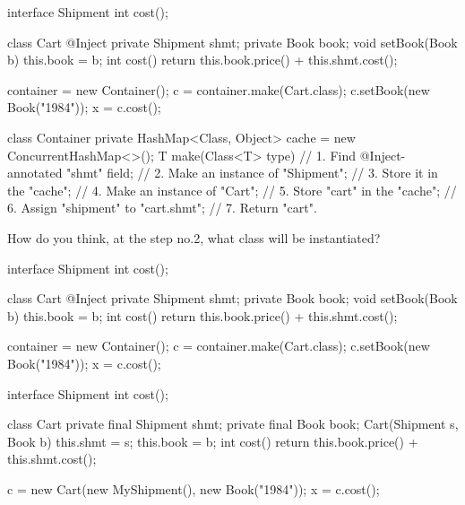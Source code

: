 \documentclass{article}
\begin{document}
\begin{pptWide}{2}
{\scriptsize\begin{ffcode}
interface Shipment
  int cost();

class Cart
  @Inject private Shipment shmt;
  private Book book;
  void setBook(Book b)
    this.book = b;
  int cost()
    return this.book.price() + this.shmt.cost();

container = new Container();
c = container.make(Cart.class);
c.setBook(new Book("1984"));
x = c.cost();
\end{ffcode}
}
\par\columnbreak\par
{\scriptsize\begin{ffcode}
class Container {
  private HashMap<Class, Object> cache =
    new ConcurrentHashMap<>();
  T make(Class<T> type) {
    // 1. Find @Inject-annotated "shmt" field;
    // 2. Make an instance of "Shipment";
    // 3. Store it in the "cache";
    // 4. Make an instance of "Cart";
    // 5. Store "cart" in the "cache";
    // 6. Assign "shipment" to "cart.shmt";
    // 7. Return "cart".
  }
}
\end{ffcode}
}
How do you think, at the step no.2,
what class will be instantiated?
\end{pptWide}
\par
\plush{}

\begin{pptWide}{2}
{\scriptsize\begin{ffcode}
interface Shipment
  int cost();

class Cart
  @Inject private Shipment shmt;
  private Book book;
  void setBook(Book b)
    this.book = b;
  int cost()
    return this.book.price() + this.shmt.cost();

container = new Container();
c = container.make(Cart.class);
c.setBook(new Book("1984"));
x = c.cost();
\end{ffcode}
}
\par\columnbreak\par
{\scriptsize\begin{ffcode}
interface Shipment
  int cost();

class Cart
  private final Shipment shmt;
  private final Book book;
  Cart(Shipment s, Book b)
    this.shmt = s;
    this.book = b;
  int cost()
    return this.book.price() + this.shmt.cost();

c = new Cart(new MyShipment(), new Book("1984"));
x = c.cost();
\end{ffcode}
}
\end{pptWide}
\par
\plush{}
\end{document}
